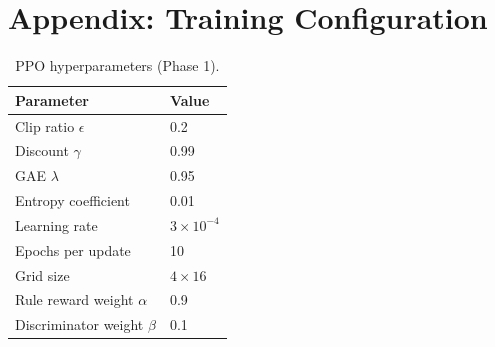 \documentclass[11pt]{article}
\begin{document}
\section{Appendix: Training Configuration}

\begin{table}[H]
\centering
\caption{PPO hyperparameters (Phase 1).}
\begin{tabular}{ll}
\toprule
\textbf{Parameter} & \textbf{Value} \\
\midrule
Clip ratio $\epsilon$ & 0.2 \\
Discount $\gamma$ & 0.99 \\
GAE $\lambda$ & 0.95 \\
Entropy coefficient & 0.01 \\
Learning rate & $3 \times 10^{-4}$ \\
Epochs per update & 10 \\
Grid size & $4 \times 16$ \\
Rule reward weight $\alpha$ & 0.9 \\
Discriminator weight $\beta$ & 0.1 \\
\bottomrule
\end{tabular}
\end{table}
\end{document}
